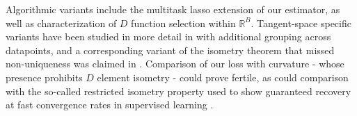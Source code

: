 Algorithmic variants include the multitask lasso \citep{ Hastie2015-qa} extension of our estimator, as well as characterization of $D$ function selection within $\mathbb R^B$.
Tangent-space specific variants have been studied in more detail in \citet{Koelle2022-ju, Koelle2024-no} with additional grouping across datapoints, and a corresponding variant of the isometry theorem that missed non-uniqueness was claimed in \citet{Koelle2022-lp}.
Comparison of our loss with curvature - whose presence prohibits $D$ element isometry - could prove fertile, as could comparison with the so-called restricted isometry property used to show guaranteed recovery at fast convergence rates in supervised learning \citep{Candes2005-dd, Hastie2015-qa}.


